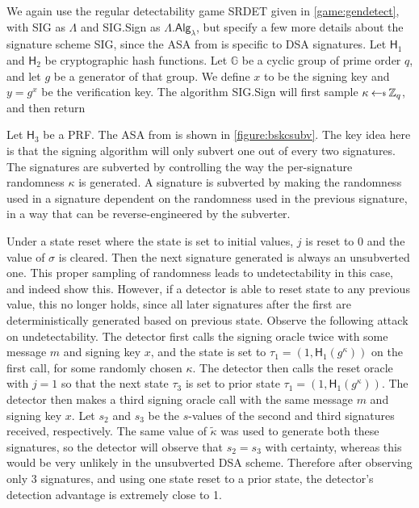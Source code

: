 We again use the regular detectability game SRDET given in \autoref{game:gendetect}, with \textsf{SIG} as $\mathsf{\Lambda}$ and \textsf{SIG.Sign} as $\mathsf{\Lambda.Alg}_\lambda$, but specify a few more details about the signature scheme \textsf{SIG}, since the ASA from \cite{BSKC2019} is specific to DSA signatures. Let $\textsf{H}_1$ and $\textsf{H}_2$ be cryptographic hash functions. Let $\mathbb{G}$ be a cyclic group of prime order $q$, and let $g$ be a generator of that group. We define $x$ to be the signing key and $y=g^x$ be the verification key. The algorithm \textsf{SIG.Sign} will first sample $\kappa \sample \mathbb{Z}_q$, and then return

Let $\mathsf{H}_3$ be a PRF. The ASA from \cite{BSKC2019} is shown in \autoref{figure:bskcsubv}. The key idea here is that the signing algorithm will only subvert one out of every two signatures. The signatures are subverted by controlling the way the per-signature randomness $\kappa$ is generated. A signature is subverted by making the randomness used in a signature dependent on the randomness used in the previous signature, in a way that can be reverse-engineered by the subverter.

Under a state reset where the state is set to initial values, $j$ is reset to 0 and the value of $\sigma$ is cleared. Then the next signature generated is always an unsubverted one. This proper sampling of randomness leads to undetectability in this case, and indeed \cite{BSKC2019} show this. However, if a detector is able to reset state to any previous value, this no longer holds, since all later signatures after the first are deterministically generated based on previous state. Observe the following attack on undetectability. The detector first calls the signing oracle twice with some message $m$ and signing key $x$, and the state is set to $\tau_1 = (1, \textsf{H}_1(g^\kappa))$ on the first call, for some randomly chosen $\kappa$. The detector then calls the reset oracle with $j=1$ so that the next state $\tau_3$ is set to prior state $\tau_1 = (1, \textsf{H}_1(g^\kappa))$. The detector then makes a third signing oracle call with the same message $m$ and signing key $x$. Let $s_2$ and $s_3$ be the $s$-values of the second and third signatures received, respectively. The same value of $\tilde{\kappa}$ was used to generate both these signatures, so the detector will observe that $s_2=s_3$ with certainty, whereas this would be very unlikely in the unsubverted DSA scheme. Therefore after observing only 3 signatures, and using one state reset to a prior state, the detector's detection advantage is extremely close to 1.


